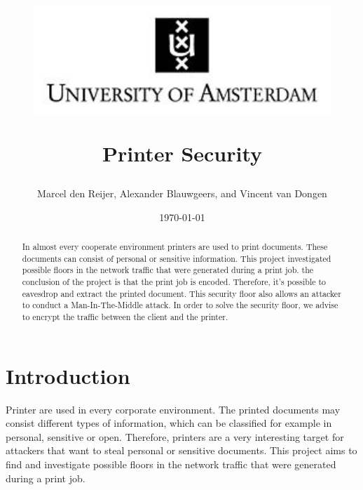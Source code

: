 \documentclass[a4paper]{article}
\begin{document}
	\title{
	\begin{figure}[!ht]
	\begin{center}
			\includegraphics[width=1.0\textwidth]{jpg.jpg}
	\end{center}
	\end{figure}
	\Huge Printer Security 
	}
	
	
	\author
	{\large {Marcel den Reijer, Alexander Blauwgeers, and Vincent van Dongen } }

	\date{
	\today
	}
	\maketitle
	\setlength{\parindent}{0pt}

\vspace{0cm}
\begin{abstract}
In almost every cooperate environment printers are used to print documents.  These documents can consist of personal or sensitive information.  This project investigated possible floors in the network traffic that were generated during a print job. the conclusion of the project is that the print job is encoded. Therefore, it's possible to eavesdrop  and extract the printed document. This security floor also allows an attacker to conduct a Man-In-The-Middle attack.  In order to solve the security floor, we advise to encrypt the traffic between the client and the printer.
\end{abstract}
	\newpage
	\tableofcontents
	\newpage
	
\section{Introduction} 
Printer are used in every corporate environment. The printed documents may consist different types of information, which can be classified for example in personal, sensitive or open.  Therefore,  printers are a very interesting target for attackers that want to steal personal or sensitive documents. This project aims to find and investigate possible floors in the network traffic that were generated during a print job.
\end{document}
